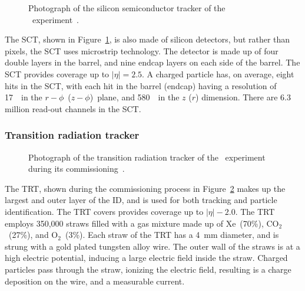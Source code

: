 \begin{figure}[ht]
  \caption{
    Photograph of the silicon semiconductor tracker of the
    \atlas\ experiment~\cite{Maximilien:883305}.
  }
  \label{fig:sct_photo}
\end{figure}


The SCT, shown in Figure~\ref{fig:sct_photo}, is also made of silicon
detectors, but rather than pixels, the SCT uses microstrip technology.
The detector is made up of four double layers in the barrel, and nine
endcap layers on each side of the barrel.
The SCT provides coverage up to $|\eta| = 2.5$.
A charged particle has, on average, eight hits in the SCT, with each hit
in the barrel (endcap) having a resolution of 17~\um\ in the
$r-\phi$~($z-\phi$)~plane, and 580~\um\ in the $z$ ($r$) dimension.
There are 6.3 million read-out channels in the SCT.

\FloatBarrier
\subsubsection{Transition radiation tracker} 
\label{sec:trt}

\begin{figure}[ht]
  \caption{
    Photograph of the transition radiation tracker of the
    \atlas\ experiment during its commissioning~\cite{Maximilien:889555}.
  }
  \label{fig:trt_module}
\end{figure}

The TRT, shown during the commissioning process in Figure~\ref{fig:trt_module}
makes up the largest and outer layer of the ID, and is used for both tracking
and particle identification.
The TRT covers provides coverage up to $|\eta| - 2.0$.
The TRT employs 350,000 straws filled with a gas mixture made up of
Xe~(70\%), $\text{CO}_2$~(27\%), and $\text{O}_2$~(3\%).
Each straw of the TRT has a 4~mm diameter, and is strung with a gold plated
tungsten alloy wire.
The outer wall of the straws is at a high electric potential, inducing a large
electric field inside the straw.
Charged particles pass through the straw, ionizing the electric field,
resulting is a charge deposition on the wire, and a measurable current.

